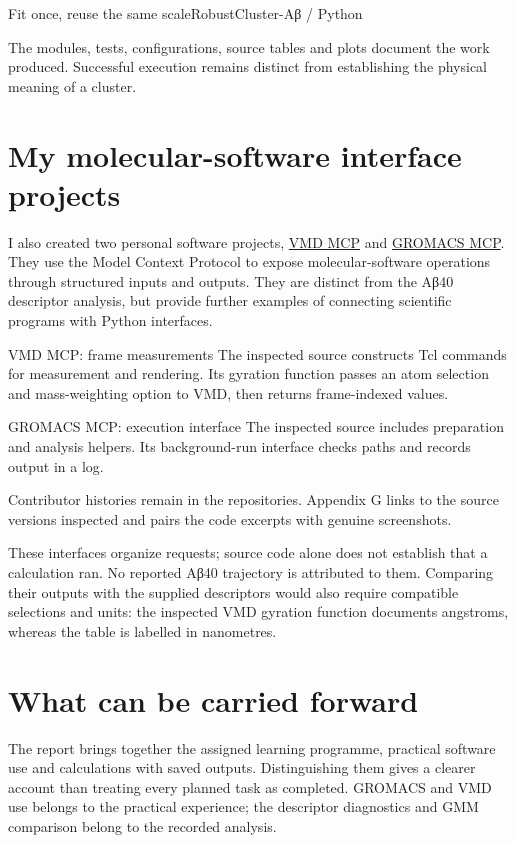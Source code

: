 \begin{codepanel}{Fit once, reuse the same scale}{RobustCluster-Aβ / Python}

\end{codepanel}


The modules, tests, configurations, source tables and plots document the work produced. Successful execution remains distinct from establishing the physical meaning of a cluster.

\section{My molecular-software interface projects}
I also created two personal software projects, \href{https://github.com/Alierkn/vmd-mcp}{VMD MCP} and \href{https://github.com/Alierkn/gromacs-mcp}{GROMACS MCP}. They use the Model Context Protocol to expose molecular-software operations through structured inputs and outputs. They are distinct from the Aβ40 descriptor analysis, but provide further examples of connecting scientific programs with Python interfaces.

\par\addvspace{8pt}\noindent
\begin{comparisonpanel}{VMD MCP: frame measurements}
The inspected source constructs Tcl commands for measurement and rendering. Its gyration function passes an atom selection and mass-weighting option to VMD, then returns frame-indexed values.
\end{comparisonpanel}\hfill
\begin{comparisonpanel}{GROMACS MCP: execution interface}
The inspected source includes preparation and analysis helpers. Its background-run interface checks paths and records output in a log.
\end{comparisonpanel}
\par\addvspace{8pt}
Contributor histories remain in the repositories. Appendix G links to the source versions inspected and pairs the code excerpts with genuine screenshots.

These interfaces organize requests; source code alone does not establish that a calculation ran. No reported Aβ40 trajectory is attributed to them. Comparing their outputs with the supplied descriptors would also require compatible selections and units: the inspected VMD gyration function documents angstroms, whereas the table is labelled in nanometres.

\section{What can be carried forward}
The report brings together the assigned learning programme, practical software use and calculations with saved outputs. Distinguishing them gives a clearer account than treating every planned task as completed. GROMACS and VMD use belongs to the practical experience; the descriptor diagnostics and GMM comparison belong to the recorded analysis.

